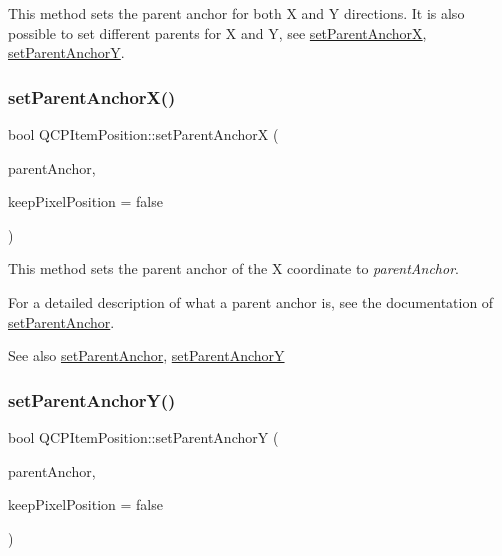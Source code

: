 This method sets the parent anchor for both X and Y directions. It is also possible to set different parents for X and Y, see \hyperlink{classQCPItemPosition_add71461a973927c74e42179480916d9c}{set\+Parent\+AnchorX}, \hyperlink{classQCPItemPosition_add5ec1db9d19cec58a3b5c9e0a0c3f9d}{set\+Parent\+AnchorY}. \mbox{\label{classQCPItemPosition_add71461a973927c74e42179480916d9c}} 
\subsubsection{\texorpdfstring{set\+Parent\+Anchor\+X()}{setParentAnchorX()}}
{\footnotesize\ttfamily bool Q\+C\+P\+Item\+Position\+::set\+Parent\+AnchorX (\begin{DoxyParamCaption}\item[{\hyperlink{classQCPItemAnchor}{Q\+C\+P\+Item\+Anchor} $\ast$}]{parent\+Anchor,  }\item[{bool}]{keep\+Pixel\+Position = {\ttfamily false} }\end{DoxyParamCaption})}

This method sets the parent anchor of the X coordinate to {\itshape parent\+Anchor}.

For a detailed description of what a parent anchor is, see the documentation of \hyperlink{classQCPItemPosition_ac094d67a95d2dceafa0d50b9db3a7e51}{set\+Parent\+Anchor}.

\begin{DoxySeeAlso}{See also}
\hyperlink{classQCPItemPosition_ac094d67a95d2dceafa0d50b9db3a7e51}{set\+Parent\+Anchor}, \hyperlink{classQCPItemPosition_add5ec1db9d19cec58a3b5c9e0a0c3f9d}{set\+Parent\+AnchorY} 
\end{DoxySeeAlso}
\mbox{\label{classQCPItemPosition_add5ec1db9d19cec58a3b5c9e0a0c3f9d}} 
\subsubsection{\texorpdfstring{set\+Parent\+Anchor\+Y()}{setParentAnchorY()}}
{\footnotesize\ttfamily bool Q\+C\+P\+Item\+Position\+::set\+Parent\+AnchorY (\begin{DoxyParamCaption}\item[{\hyperlink{classQCPItemAnchor}{Q\+C\+P\+Item\+Anchor} $\ast$}]{parent\+Anchor,  }\item[{bool}]{keep\+Pixel\+Position = {\ttfamily false} }\end{DoxyParamCaption})}

